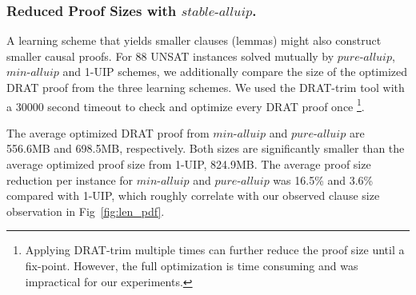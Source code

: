 \documentclass[runningheads]{llncs}
\newcommand{\oneuip}{1-UIP\xspace}
\newcommand{\stablealluip}{\textit{stable-alluip}\xspace}
\newcommand{\allUipPure}{\textit{pure-alluip}\xspace}
\newcommand{\allUipMin}{\textit{min-alluip}\xspace}
\begin{document}
\subsubsection{Reduced Proof Sizes with $\stablealluip$.}
A learning scheme that yields smaller clauses (lemmas) might also
construct smaller causal proofs. For 88 UNSAT instances solved mutually
by $\allUipPure$, $\allUipMin$ and \oneuip schemes, we additionally
compare the size of the optimized DRAT proof from the three learning schemes. 
We used the DRAT-trim tool
\cite{DBLP:conf/sat/WetzlerHH14} with a 30000 second timeout to check and
optimize every DRAT proof once \footnote{Applying DRAT-trim multiple
  times can further reduce the proof size until a fix-point. However,
  the full optimization is time consuming and was impractical for our
  experiments.}.

The average optimized DRAT proof from $\allUipMin$ and $\allUipPure$
are 556.6MB and 698.5MB, respectively. Both sizes are significantly
smaller than the average optimized proof size from \oneuip, 824.9MB.
The average proof size reduction per instance for $\allUipMin$ and
$\allUipPure$ was 16.5\% and 3.6\% compared with \oneuip, which roughly
correlate with our observed clause size observation in
Fig~\ref{fig:len_pdf}.
\end{document}
